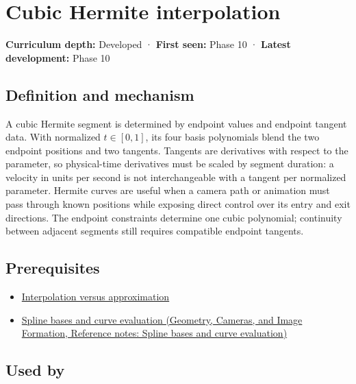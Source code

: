 \hypertarget{appendix-db3aef8f2fd6}{}\label{referencestart:appendix-db3aef8f2fd6}
\section{Cubic Hermite interpolation}\label{appendix-db3aef8f2fd6-cubic-hermite-interpolation}

\textbf{Curriculum depth:} Developed · \textbf{First seen:} Phase 10 · \textbf{Latest development:} Phase 10

\subsection{Definition and mechanism}\label{appendix-db3aef8f2fd6-definition-and-mechanism}

A cubic Hermite segment is determined by endpoint values and endpoint tangent data. With normalized \(t\in[0,1]\), its four basis polynomials blend the two endpoint positions and two tangents. Tangents are derivatives with respect to the parameter, so physical-time derivatives must be scaled by segment duration: a velocity in units per second is not interchangeable with a tangent per normalized parameter. Hermite curves are useful when a camera path or animation must pass through known positions while exposing direct control over its entry and exit directions. The endpoint constraints determine one cubic polynomial; continuity between adjacent segments still requires compatible endpoint tangents.

\subsection{Prerequisites}\label{appendix-db3aef8f2fd6-prerequisites}

\begin{itemize}
\tightlist
\item
  \hyperref[appendix-0c2a5f69851e]{Interpolation versus approximation}
\item
  \href{../03-Geometry-Cameras-and-Image-Formation/main.pdf\#nameddest=appendix-f28eeec97a3d}{Spline bases and curve evaluation (Geometry, Cameras, and Image Formation, Reference notes: Spline bases and curve evaluation)}
\end{itemize}

\subsection{Used by}\label{appendix-db3aef8f2fd6-used-by}

